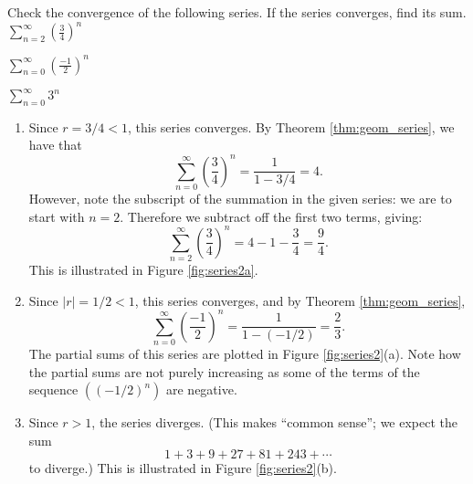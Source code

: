 \documentclass{ximera}
\begin{document}
\begin{example}
Check the convergence of the following series. If the series
converges, find its sum.
$\sum_{n=2}^\infty \left(\frac34\right)^n$

$\sum_{n=0}^\infty \left(\frac{-1}{2}\right)^n$


$\sum_{n=0}^\infty 3^n$ 

\begin{enumerate}
\item Since $r=3/4<1$, this series converges. By Theorem
  \ref{thm:geom_series}, we have that
  \[
  \sum_{n=0}^\infty \left(\frac34\right)^n = \frac{1}{1-3/4} = 4.\]
  However, note the subscript of the summation in the given series: we
  are to start with $n=2$. Therefore we subtract off the first two
  terms, giving:
  \[
  \sum_{n=2}^\infty \left(\frac34\right)^n = 4 - 1 - \frac34 =
  \frac94.
  \]
  This is illustrated in Figure \ref{fig:series2a}.

  
\item Since $|r| = 1/2 < 1$, this series converges, and by Theorem
  \ref{thm:geom_series},
  $$\sum_{n=0}^\infty \left(\frac{-1}{2}\right)^n = \frac{1}{1-(-1/2)}
  = \frac23.$$ The partial sums of this series are plotted in Figure
  \ref{fig:series2}(a). Note how the partial sums are not purely
  increasing as some of the terms of the sequence $((-1/2)^n)$ are
  negative.
  
  
\item Since $r>1$, the series diverges. (This makes ``common sense'';
  we expect the sum $$1+3+9+27 + 81+243+\cdots$$ to diverge.) This is
  illustrated in Figure \ref{fig:series2}(b).
  
\end{enumerate}
\end{example}
\end{document}
